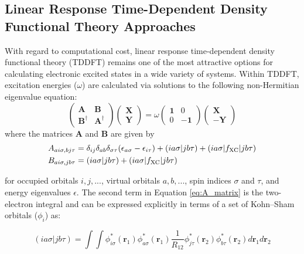 \documentclass[final]{emory}
\begin{document}
\subsection{Linear Response Time-Dependent Density Functional Theory Approaches}
With regard to computational cost, linear response time-dependent density functional theory (TDDFT) remains one of the most attractive options for calculating electronic excited states in a wide variety of systems. Within TDDFT, excitation energies ($\omega$) are calculated via solutions to the following non-Hermitian eigenvalue equation:
\begin{equation}
\label{eq:tddft_eigenvalue_equation}
\begin{pmatrix}
\mathbf{A} & \mathbf{B} \\
\mathbf{B^{\dagger}} & \mathbf{A^{\dagger}} 
\end{pmatrix} 
\begin{pmatrix}
\mathbf{X}\\
\mathbf{Y}
\end{pmatrix}
= \omega
\begin{pmatrix}
\mathbf{1} & 0 \\
0 & -\mathbf{1}
\end{pmatrix}
\begin{pmatrix}
\mathbf{X} \\
\mathbf{-Y}
\end{pmatrix}
\end{equation}
where the matrices $\mathbf{A}$ and $\mathbf{B}$ are given by
\begin{align}
\label{eq:A_matrix}
A_{ai\sigma,bj\tau} &=  \delta_{ij} \delta_{ab} \delta_{\sigma\tau}(\epsilon_{a\sigma} - \epsilon_{i\tau}) + (ia\sigma|jb\tau) + (ia\sigma|f_{\rm XC}|jb\tau) \\
\label{eq:B_matrix}
B_{ai\sigma,jb\tau} &= (ia\sigma|jb\tau) + (ia\sigma|f_{\rm XC}|jb\tau)
\end{align}

for occupied orbitals $i,j,...$, virtual orbitals $a,b,...$, spin indices $\sigma$ and $\tau$, and energy eigenvalues $\epsilon$. The second term in Equation \ref{eq:A_matrix} is the two-electron integral and can be expressed explicitly in terms of a set of Kohn--Sham orbitals ($\phi_i$) as:

\begin{equation}
(ia\sigma|jb\tau) = \int \int \phi^*_{i\sigma}(\mathbf{r}_1)  \phi^*_{a\sigma}(\mathbf{r}_1) \frac{1}{R_{12}} \phi^*_{j\tau}(\mathbf{r}_2) \phi^*_{b\tau}(\mathbf{r}_2) d\mathbf{r}_1 d\mathbf{r}_2
\end{equation}
\end{document}
